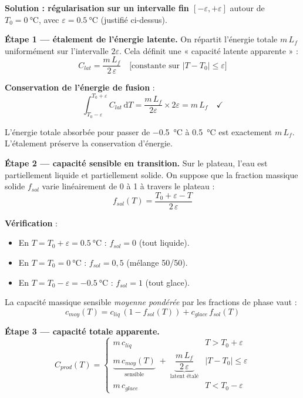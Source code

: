 \documentclass[11pt,a4paper]{article}
\begin{document}
\begin{demo}
\textbf{Solution : régularisation sur un intervalle fin $[-\varepsilon, +\varepsilon]$}
autour de $T_0 = \SI{0}{\celsius}$, avec $\varepsilon = \SI{0,5}{\celsius}$ (justifié
ci-dessus).

\medskip
\textbf{Étape 1 — étalement de l'énergie latente.}
On répartit l'énergie totale $m\,L_f$ uniformément sur l'intervalle $2\varepsilon$. Cela
définit une « capacité latente apparente » :
\begin{equation}
C_{lat} = \frac{m\,L_f}{2\,\varepsilon}\quad \text{[constante sur }|T - T_0| \le \varepsilon\text{]}
\end{equation}

\textbf{Conservation de l'énergie de fusion} :
$$\int_{T_0-\varepsilon}^{T_0+\varepsilon} C_{lat}\,\mathrm{d}T
= \frac{m\,L_f}{2\varepsilon} \times 2\varepsilon = m\,L_f \quad\checkmark$$

L'énergie totale absorbée pour passer de \SI{-0,5}{\celsius} à \SI{+0,5}{\celsius} est
exactement $m\,L_f$. L'étalement préserve la conservation d'énergie.

\medskip
\textbf{Étape 2 — capacité sensible en transition.}
Sur le plateau, l'eau est partiellement liquide et partiellement solide. On suppose que la
fraction massique solide $f_{sol}$ varie linéairement de 0 à 1 à travers le plateau :
\begin{equation}
f_{sol}(T) = \frac{T_0 + \varepsilon - T}{2\,\varepsilon}
\end{equation}

\textbf{Vérification} :
\begin{itemize}[itemsep=0pt]
\item En $T = T_0 + \varepsilon = \SI{+0,5}{\celsius}$ : $f_{sol} = 0$ (tout liquide). \checkmark
\item En $T = T_0 = \SI{0}{\celsius}$ : $f_{sol} = 0,5$ (mélange 50/50).
\item En $T = T_0 - \varepsilon = \SI{-0,5}{\celsius}$ : $f_{sol} = 1$ (tout glace). \checkmark
\end{itemize}

La capacité massique sensible \emph{moyenne pondérée} par les fractions de phase vaut :
\begin{equation}
\boxed{\;c_{moy}(T) = c_{liq}\,(1 - f_{sol}(T)) + c_{glace}\,f_{sol}(T)\;}
\end{equation}

\medskip
\textbf{Étape 3 — capacité totale apparente.}
\begin{equation}
\boxed{\;C_{prod}(T) =
\begin{cases}
m\,c_{liq} & T > T_0 + \varepsilon \\[0.3em]
\underbrace{m\,c_{moy}(T)}_{\text{sensible}} \;+\; \underbrace{\dfrac{m\,L_f}{2\,\varepsilon}}_{\text{latent étalé}}
& |T - T_0| \le \varepsilon \\[0.6em]
m\,c_{glace} & T < T_0 - \varepsilon
\end{cases}\;}
\label{eq:cprod}
\end{equation}
\end{demo}
\end{document}
